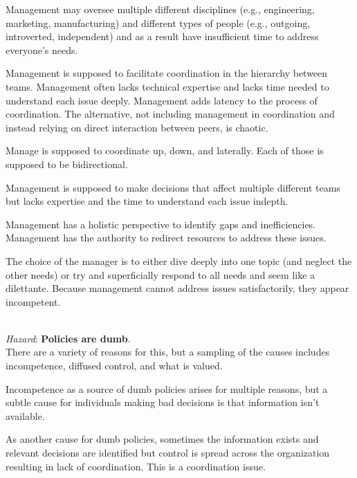 Management may oversee multiple different disciplines (e.g., engineering, marketing, manufacturing) and different types of people (e.g., outgoing, introverted, independent) and as a result have insufficient time to address everyone's needs.

Management is supposed to facilitate coordination in the hierarchy between teams. Management often lacks technical expertise and lacks time needed to understand each issue deeply. Management adds latency to the process of coordination. The alternative, not including management in coordination and instead relying on direct interaction between peers, is chaotic.

Manage is supposed to coordinate up, down, and laterally. Each of those is supposed to be bidirectional.

Management is supposed to make decisions that affect multiple different teams but lacks expertise and the time to understand each issue indepth.

Management has a holistic perspective to identify gaps and inefficiencies. Management has the authority to redirect resources to address these issues.

The choice of the manager is to either dive deeply into one topic (and neglect the other needs) or try and superficially respond to all needs and seem like a dilettante. Because management cannot address issues satisfactorily, they appear incompetent.





\ \\
\textit{Hazard}: \textbf{Policies are dumb}.\\
There are a variety of reasons for this, but a sampling of the causes includes incompetence, diffused control, and what is valued. 

Incompetence as a source of dumb policies arises for multiple reasons, but a subtle cause for individuals making bad decisions is that information isn't available.

As another cause for dumb policies, sometimes the information exists and relevant decisions are identified but control is spread across the organization resulting in lack of coordination. This is a coordination issue.

